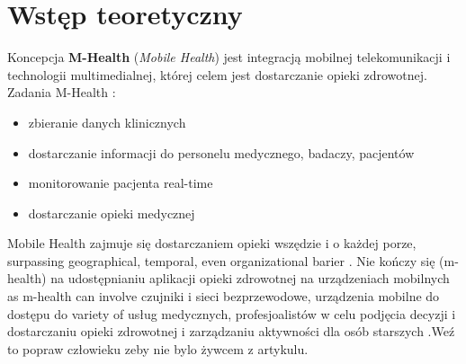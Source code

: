 \chapter{Wstęp teoretyczny}
\label{cha:wstep_teoretyczny}

Koncepcja \textbf{M-Health} (\emph{Mobile Health}) jest integracją mobilnej telekomunikacji i technologii multimedialnej, której celem jest dostarczanie opieki zdrowotnej.\\
Zadania M-Health \cite{5969916} :
\begin{itemize}
\item zbieranie danych klinicznych
\item dostarczanie informacji do personelu medycznego, badaczy, pacjentów
\item monitorowanie pacjenta real-time
\item dostarczanie opieki medycznej
\end{itemize}
Mobile Health zajmuje się dostarczaniem opieki wszędzie i o każdej porze, surpassing geographical, temporal, even organizational barier \cite{6655256}. Nie kończy się (m-health) na udostępnianiu aplikacji opieki zdrowotnej na urządzeniach mobilnych as m-health can involve czujniki i sieci bezprzewodowe, urządzenia mobilne do dostępu do variety of usług medycznych, profesjoalistów w celu podjęcia decyzji i dostarczaniu opieki zdrowotnej i zarządzaniu aktywności dla osób starszych \cite{Varshney2014}.Weź to popraw człowieku zeby nie bylo żywcem z artykulu.


















